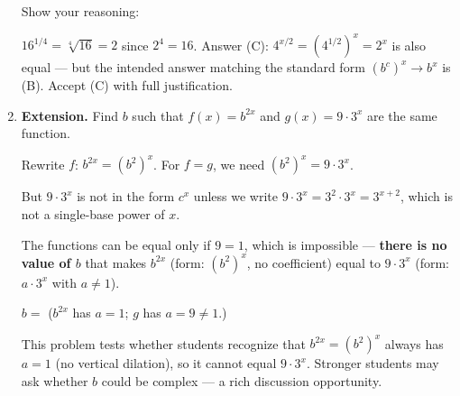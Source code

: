 \documentclass[10pt]{article}
\begin{document}
\begin{enumerate}[itemsep=18pt]
      \leavevmode{}\phantom{Answer:} \gradedblank[id=hw5a, type=choice, points=1, answer=B]{1.5cm}{13pt} \quad Show your reasoning:

      \rubricbox[0.04in]{\gradedblank[id=hw5b, type=rubric, points=2,
  display={$16^{x/4} = (16^{1/4})^x = 2^x$, since $2^4 = 16$.}]{\linewidth}{14pt}}

      \begin{teachernote}
        $16^{1/4} = \sqrt[4]{16} = 2$ since $2^4 = 16$. Answer (C): $4^{x/2} = (4^{1/2})^x = 2^x$ is
        also equal --- but the intended answer matching the standard form $(b^c)^x \to b^x$ is (B).
        Accept (C) with full justification.
      \end{teachernote}

\item \textbf{Extension.} Find $b$ such that $f(x) = b^{2x}$ and $g(x) = 9 \cdot 3^x$ are the
      same function.

      \vspace{0.06in}
      Rewrite $f$: $b^{2x} = (b^2)^x$.
      For $f = g$, we need $(b^2)^x = 9 \cdot 3^x$.

      But $9 \cdot 3^x$ is not in the form $c^x$ unless we write $9 \cdot 3^x = 3^2 \cdot 3^x = 3^{x+2}$,
      which is not a single-base power of $x$.

      The functions can be equal only if $9 = 1$, which is impossible --- \textbf{there is no value of $b$}
      that makes $b^{2x}$ (form: $(b^2)^x$, no coefficient) equal to $9 \cdot 3^x$ (form: $a \cdot 3^x$ with $a \ne 1$).

      $b = $ \smash{\gradedblank[id=hw6, type=short, check=text, points=2, answer={no solution}]{2.5cm}{13pt}} \quad ($b^{2x}$ has $a = 1$; $g$ has $a = 9 \ne 1$.)

      \begin{teachernote}
        This problem tests whether students recognize that $b^{2x} = (b^2)^x$ always has $a = 1$
        (no vertical dilation), so it cannot equal $9 \cdot 3^x$. Stronger students may ask whether
        $b$ could be complex --- a rich discussion opportunity.
      \end{teachernote}

\end{enumerate}
\end{document}
